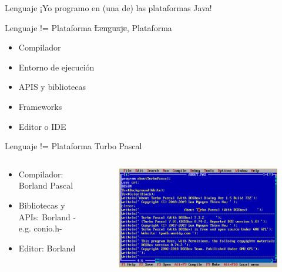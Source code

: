 \documentclass[aspectratio=169]{beamer}
\begin{document}
\begin{frame}{Lenguaje}
    ¡Yo programo en (una de) las plataformas Java!
\end{frame}


\begin{frame}{Lenguaje != Plataforma}
    \sout{Lenguaje}, Plataforma
	\begin{itemize}
	\item Compilador
    \item Entorno de ejecución
    \item APIS y bibliotecas
    \item Frameworks
    \item Editor o IDE
	\end{itemize}
\end{frame}

\begin{frame}{Lenguaje != Plataforma}
    Turbo Pascal

    \begin{columns}[T] %
	     \begin{column}[T]{0.5\textwidth} %
            \begin{itemize}
                \item Compilador: Borland Pascal
                \item Bibliotecas y APIs: Borland -e.g. conio.h-
                \item Editor: Borland
            \end{itemize}
	     \end{column}
	     \begin{column}[T]{7cm} %
   			\begin{figure}
   			\centering
   			\includegraphics[width=\linewidth]{Images/pascal}
   			\end{figure}

	     \end{column}
     \end{columns}
\end{frame}
\end{document}
